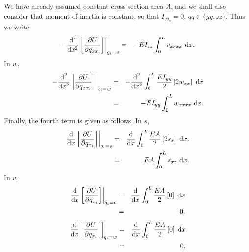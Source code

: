 We have already assumed constant cross-section area $A$, and we shall also consider that moment of inertia is constant, so that $I_{qq_{x}}=0$, $qq\in\{yy,zz\}$. Thus we write
\begin{eqnarray}
\left.-\frac{\text d^2}{\text dx^2}\left[\frac{\partial U}{\partial q_{xx_i}}\right]\right|_{q_i=v} 
&=& -EI_{zz}\int_0^L v_{xxxx}\text{ d}x. 
\end{eqnarray}
In $w$,
\begin{eqnarray}
\left.-\frac{\text d^2}{\text dx^2}\left[\frac{\partial U}{\partial q_{xx_i}}\right]\right|_{q_i=w} 
&=& -\frac{\text d^2}{\text dx^2}\int_0^L\frac{EI_{yy}}{2}\left[ 2w_{xx} \right]\text{ d}x\\
&=& -EI_{yy}\int_0^L w_{xxxx}\text{ d}x. 
\end{eqnarray}
Finally, the fourth term is given as follows. In $s$,
\begin{eqnarray}
\left.\frac{\text d}{\text dx}\left[\frac{\partial U}{\partial q_{x_i}}\right]\right|_{q_i=s} 
&=& \frac{\text d}{\text dx}\int_0^L\frac{EA}{2}\left[ 2s_{x} \right]\text{ d}x,\\
&=& EA\int_0^L s_{xx}\text{ d}x.
\end{eqnarray}
In $v$,
\begin{eqnarray}
\left.\frac{\text d}{\text dx}\left[\frac{\partial U}{\partial q_{x_i}}\right]\right|_{q_i=v} 
&=& \frac{\text d}{\text dx}\int_0^L\frac{EA}{2}\left[ 0\right]\text{ d}x\\
&=& 0.
\end{eqnarray}
\begin{eqnarray}
\left.\frac{\text d}{\text dx}\left[\frac{\partial U}{\partial q_{x_i}}\right]\right|_{q_i=w} 
&=& \frac{\text d}{\text dx}\int_0^L\frac{EA}{2}\left[ 0\right]\text{ d}x\\
&=& 0.
\end{eqnarray}

\begin{comment}
Observe that in the time derivatives, the material property $E$ and area $A$ are considered constant. However, we shall assume in later work that the material's cross-section varies along the beam's length. This will also result in a change of moment of inertia, $I_{zz}$ (say). Thus we must include the terms resultant of the product rule. Finally, note that the material property $E$ is always constant for the purposes of this work.

A clear discrepancy has emerged --- in the kinetic energy evaluation, the coordinate $u$ is tested, whereas in the strain energy evaluation, the coordinate $s$ is tested. The relationship between $s$, $\dot s$, and $u$, $\dot u$ is given by Eqn.~\ref{eq:stretch.full} and Eqn.~\ref{eq:stretch.full.dt}, respectively.

To resolve this, we simply substitute the definitions of $u,\dot{u}$ into the kinetic energy terms. Additionally, we will summarize these results by grouping the non-zero terms into their respective coordinate references.
\end{comment}

